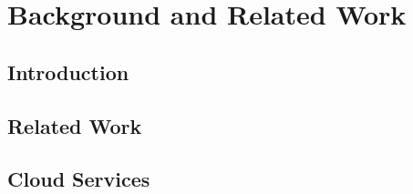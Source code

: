 \part{Background and Related Work}
    \chapter{Introduction}
        
    \chapter{Related Work}
        
    \chapter{Cloud Services}
        